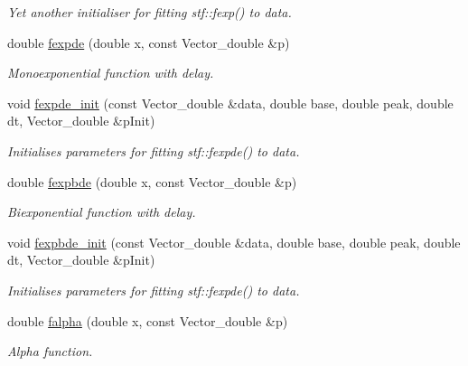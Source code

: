 \begin{DoxyCompactItemize}
\begin{DoxyCompactList}\small\item\em Yet another initialiser for fitting stf::fexp() to {\itshape data\/}. \item\end{DoxyCompactList}\item 
double \hyperlink{group__stfgen_ga214dc6bb2e3a2ad37ab9e4650b55c632}{fexpde} (double x, const Vector\_\-double \&p)
\begin{DoxyCompactList}\small\item\em Monoexponential function with delay. \item\end{DoxyCompactList}\item 
void \hyperlink{group__stfgen_ga4c3336556c6aa992cf19e1b2e4ec7a76}{fexpde\_\-init} (const Vector\_\-double \&data, double base, double peak, double dt, Vector\_\-double \&pInit)
\begin{DoxyCompactList}\small\item\em Initialises parameters for fitting stf::fexpde() to {\itshape data\/}. \item\end{DoxyCompactList}\item 
double \hyperlink{group__stfgen_ga4dd9d335d263c75d61961db8bb1fe1e2}{fexpbde} (double x, const Vector\_\-double \&p)
\begin{DoxyCompactList}\small\item\em Biexponential function with delay. \item\end{DoxyCompactList}\item 
void \hyperlink{group__stfgen_gaf0561e7b630cce2263693f8e86167eea}{fexpbde\_\-init} (const Vector\_\-double \&data, double base, double peak, double dt, Vector\_\-double \&pInit)
\begin{DoxyCompactList}\small\item\em Initialises parameters for fitting stf::fexpde() to {\itshape data\/}. \item\end{DoxyCompactList}\item 
double \hyperlink{group__stfgen_gafa6594e79d6dd700e3dfc91528f5be56}{falpha} (double x, const Vector\_\-double \&p)
\begin{DoxyCompactList}\small\item\em Alpha function. \item\end{DoxyCompactList}\item 

\end{DoxyCompactItemize}
